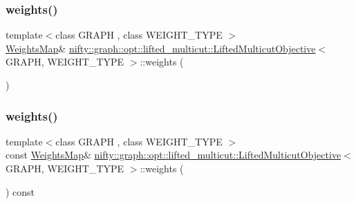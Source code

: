 \mbox{\label{classnifty_1_1graph_1_1opt_1_1lifted__multicut_1_1LiftedMulticutObjective_ae6a1e843d6c7190eccc34c1504c14c45}} 
\subsubsection{\texorpdfstring{weights()}{weights()}\hspace{0.1cm}{\footnotesize\ttfamily [1/2]}}
{\footnotesize\ttfamily template$<$class G\+R\+A\+PH , class W\+E\+I\+G\+H\+T\+\_\+\+T\+Y\+PE $>$ \\
\hyperlink{classnifty_1_1graph_1_1opt_1_1lifted__multicut_1_1LiftedMulticutObjective_ab4bdcf27ce49303201bb4332db89a78c}{Weights\+Map}\& \hyperlink{classnifty_1_1graph_1_1opt_1_1lifted__multicut_1_1LiftedMulticutObjective}{nifty\+::graph\+::opt\+::lifted\+\_\+multicut\+::\+Lifted\+Multicut\+Objective}$<$ G\+R\+A\+PH, W\+E\+I\+G\+H\+T\+\_\+\+T\+Y\+PE $>$\+::weights (\begin{DoxyParamCaption}{ }\end{DoxyParamCaption})\hspace{0.3cm}{\ttfamily [inline]}}

\mbox{\label{classnifty_1_1graph_1_1opt_1_1lifted__multicut_1_1LiftedMulticutObjective_aa713c5185db3244124de5af5a5567c5f}} 
\subsubsection{\texorpdfstring{weights()}{weights()}\hspace{0.1cm}{\footnotesize\ttfamily [2/2]}}
{\footnotesize\ttfamily template$<$class G\+R\+A\+PH , class W\+E\+I\+G\+H\+T\+\_\+\+T\+Y\+PE $>$ \\
const \hyperlink{classnifty_1_1graph_1_1opt_1_1lifted__multicut_1_1LiftedMulticutObjective_ab4bdcf27ce49303201bb4332db89a78c}{Weights\+Map}\& \hyperlink{classnifty_1_1graph_1_1opt_1_1lifted__multicut_1_1LiftedMulticutObjective}{nifty\+::graph\+::opt\+::lifted\+\_\+multicut\+::\+Lifted\+Multicut\+Objective}$<$ G\+R\+A\+PH, W\+E\+I\+G\+H\+T\+\_\+\+T\+Y\+PE $>$\+::weights (\begin{DoxyParamCaption}{ }\end{DoxyParamCaption}) const\hspace{0.3cm}{\ttfamily [inline]}}



